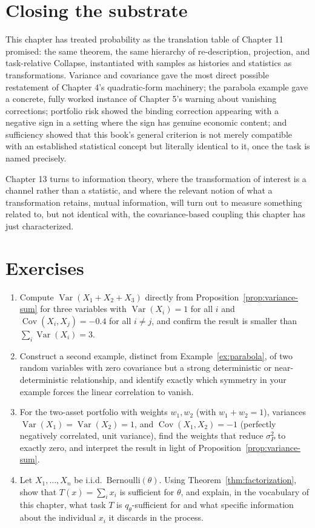 \documentclass[11pt]{book}
\begin{document}
\section{Closing the substrate}

This chapter has treated probability as the translation table of Chapter 11 promised: the same theorem, the same hierarchy of re-description, projection, and task-relative Collapse, instantiated with samples as histories and statistics as transformations. Variance and covariance gave the most direct possible restatement of Chapter 4's quadratic-form machinery; the parabola example gave a concrete, fully worked instance of Chapter 5's warning about vanishing corrections; portfolio risk showed the binding correction appearing with a negative sign in a setting where the sign has genuine economic content; and sufficiency showed that this book's general criterion is not merely compatible with an established statistical concept but literally identical to it, once the task is named precisely.

Chapter 13 turns to information theory, where the transformation of interest is a channel rather than a statistic, and where the relevant notion of what a transformation retains, mutual information, will turn out to measure something related to, but not identical with, the covariance-based coupling this chapter has just characterized.

\section*{Exercises}
\begin{enumerate}
\item Compute $\operatorname{Var}(X_1+X_2+X_3)$ directly from Proposition~\ref{prop:variance-sum} for three variables with $\operatorname{Var}(X_i)=1$ for all $i$ and $\operatorname{Cov}(X_i,X_j)=-0.4$ for all $i\ne j$, and confirm the result is smaller than $\sum_i\operatorname{Var}(X_i)=3$.
\item Construct a second example, distinct from Example~\ref{ex:parabola}, of two random variables with zero covariance but a strong deterministic or near-deterministic relationship, and identify exactly which symmetry in your example forces the linear correlation to vanish.
\item For the two-asset portfolio with weights $w_1,w_2$ (with $w_1+w_2=1$), variances $\operatorname{Var}(X_1)=\operatorname{Var}(X_2)=1$, and $\operatorname{Cov}(X_1,X_2)=-1$ (perfectly negatively correlated, unit variance), find the weights that reduce $\sigma_P^2$ to exactly zero, and interpret the result in light of Proposition~\ref{prop:variance-sum}.
\item Let $X_1,\ldots,X_n$ be i.i.d.\ $\mathrm{Bernoulli}(\theta)$. Using Theorem~\ref{thm:factorization}, show that $T(x)=\sum_i x_i$ is sufficient for $\theta$, and explain, in the vocabulary of this chapter, what task $T$ is $q_\theta$-sufficient for and what specific information about the individual $x_i$ it discards in the process.
\end{enumerate}
\end{document}
